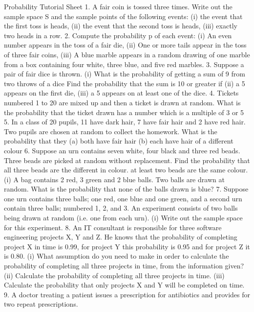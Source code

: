 Probability Tutorial Sheet
1. A fair coin is tossed three times. Write out the sample space S and the sample points of the following
events:
(i) the event that the first toss is heads,
(ii) the event that the second toss is heads,
(iii) exactly two heads in a row.
2. Compute the probability p of each event:
(i) An even number appears in the toss of a fair die,
(ii) One or more tails appear in the toss of three fair coins,
(iii) A blue marble appears in a random drawing of one marble from a box containing four white, three
blue, and five red marbles.
3. Suppose a pair of fair dice is thrown.
(i) What is the probability of getting a sum of 9 from two throws of a dice
Find the probability that the sum is 10 or greater if
(ii) a 5 appears on the first die,
(iii) a 5 appears on at least one of the dice.
4. Tickets numbered 1 to 20 are mixed up and then a ticket is drawn at random. What is the probability
that the ticket drawn has a number which is a multiple of 3 or 5
5. In a class of 20 pupils, 11 have dark hair, 7 have fair hair and 2 have red hair.
Two pupils are chosen at random to collect the homework. What is the probability that they
(a) both have fair hair
(b) each have hair of a different colour
6. Suppose an urn contains seven white, four black and three red beads. Three beads are picked at random
without replacement. Find the probability that all three beads are the different in colour. at least two
beads are the same colour.
(i) A bag contains 2 red, 3 green and 2 blue balls. Two balls are drawn at random. What is the
probability that none of the balls drawn is blue?
7. Suppose one urn contains three balls; one red, one blue and one green, and a second urn contain three
balls; numbered 1, 2, and 3. An experiment consists of two balls being drawn at random (i.e. one from
each urn).
(i) Write out the sample space for this experiment.
8. An IT consultant is responsible for three software engineering projects X, Y and Z. He knows that the
probability of completing project X in time is 0.99, for project Y this probability is 0.95 and for project
Z it is 0.80.
(i) What assumption do you need to make in order to calculate the probability of completing all three
projects in time, from the information given?
(ii) Calculate the probability of completing all three projects in time.
(iii) Calculate the probability that only projects X and Y will be completed on time.
9. A doctor treating a patient issues a prescription for antibiotics and provides for two repeat prescriptions.
